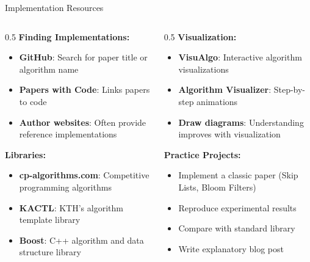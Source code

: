 \documentclass[aspectratio=169,xcolor=dvipsnames]{beamer}
\begin{document}
\begin{frame}{Implementation Resources}
  \begin{columns}
    \begin{column}{0.5\textwidth}
      \textbf{Finding Implementations:}
      \begin{itemize}
        \item \textbf{GitHub}: Search for paper title or algorithm name
        \item \textbf{Papers with Code}: Links papers to code
        \item \textbf{Author websites}: Often provide reference implementations
      \end{itemize}

      \vspace{0.3cm}
      \textbf{Libraries:}
      \begin{itemize}
        \item \textbf{cp-algorithms.com}: Competitive programming algorithms
        \item \textbf{KACTL}: KTH's algorithm template library
        \item \textbf{Boost}: C++ algorithm and data structure library
      \end{itemize}
    \end{column}

    \begin{column}{0.5\textwidth}
      \textbf{Visualization:}
      \begin{itemize}
        \item \textbf{VisuAlgo}: Interactive algorithm visualizations
        \item \textbf{Algorithm Visualizer}: Step-by-step animations
        \item \textbf{Draw diagrams}: Understanding improves with visualization
      \end{itemize}

      \vspace{0.3cm}
      \textbf{Practice Projects:}
      \begin{itemize}
        \item Implement a classic paper (Skip Lists, Bloom Filters)
        \item Reproduce experimental results
        \item Compare with standard library
        \item Write explanatory blog post
      \end{itemize}
    \end{column}
  \end{columns}
\end{frame}
\end{document}
